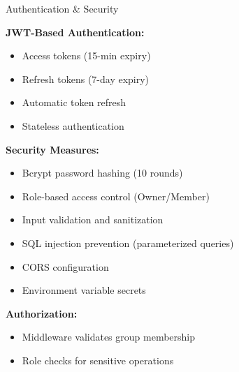 \documentclass{beamer}
\begin{document}
\begin{frame}{Authentication \& Security}

\textbf{JWT-Based Authentication:}
\begin{itemize}
    \item Access tokens (15-min expiry)
    \item Refresh tokens (7-day expiry)
    \item Automatic token refresh
    \item Stateless authentication
\end{itemize}

\vspace{0.3cm}

\textbf{Security Measures:}
\begin{itemize}
    \item Bcrypt password hashing (10 rounds)
    \item Role-based access control (Owner/Member)
    \item Input validation and sanitization
    \item SQL injection prevention (parameterized queries)
    \item CORS configuration
    \item Environment variable secrets
\end{itemize}

\vspace{0.3cm}

\textbf{Authorization:}
\begin{itemize}
    \item Middleware validates group membership
    \item Role checks for sensitive operations
\end{itemize}

\end{frame}
\end{document}
